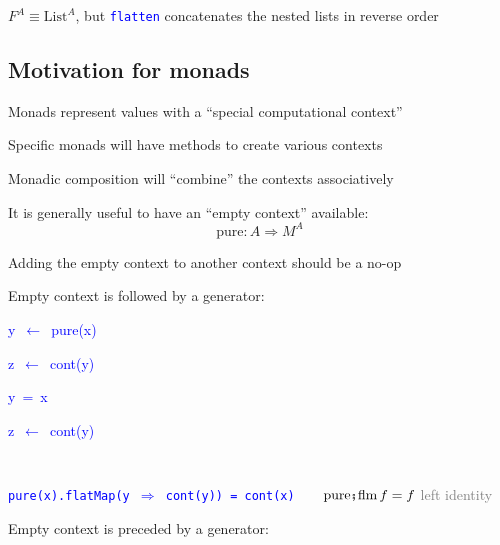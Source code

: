 $F^{A}\equiv\text{List}^{A}$, but \texttt{\textcolor{blue}{\footnotesize{}flatten}}
concatenates the nested lists in reverse order


\subsection{Motivation for monads}

Monads represent values with a ``special computational context''

Specific monads will have methods to create various contexts

Monadic composition will ``combine'' the contexts associatively

It is generally useful to have an ``empty context'' available:
\[
\text{pure}:A\Rightarrow M^{A}
\]

Adding the empty context to another context should be a no-op

Empty context is followed by a generator:

\texttt{\textcolor{blue}{\footnotesize{}}}%
\begin{minipage}[c][1\totalheight][t]{0.49\columnwidth}%
\begin{lyxcode}
\textcolor{blue}{\footnotesize{}y~$\leftarrow$~pure(x)}{\footnotesize\par}

\textcolor{blue}{\footnotesize{}z~$\leftarrow$~cont(y)}{\footnotesize\par}
\end{lyxcode}
%
\end{minipage}\texttt{\textcolor{blue}{\footnotesize{}\hfill{}}}%
\begin{minipage}[c][1\totalheight][t]{0.4\columnwidth}%
\begin{lyxcode}
\textcolor{blue}{\footnotesize{}y~=~x}{\footnotesize\par}

\textcolor{blue}{\footnotesize{}z~$\leftarrow$~cont(y)}{\footnotesize\par}
\end{lyxcode}
%
\end{minipage}\texttt{\textcolor{blue}{\footnotesize{}\hfill{}\medskip{}
}}{\footnotesize\par}

\texttt{\textcolor{blue}{\footnotesize{}pure(x).flatMap(y $\Rightarrow$
cont(y)) = cont(x)}}$\quad\quad\text{pure}\bef\text{flm}\,f=f$ \textcolor{gray}{\textendash{}
left identity}

Empty context is preceded by a generator:

